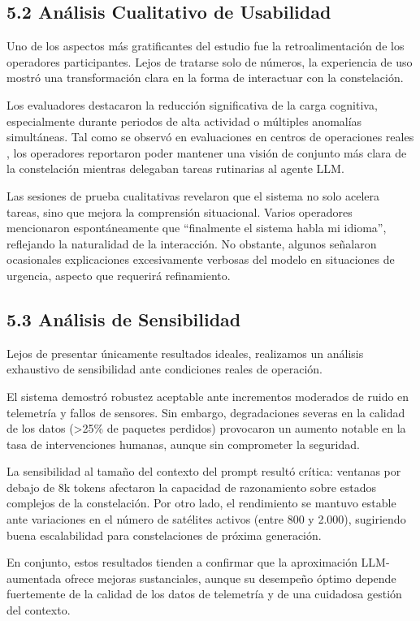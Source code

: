 \subsection{5.2 Análisis Cualitativo de Usabilidad}

Uno de los aspectos más gratificantes del estudio fue la retroalimentación de los operadores participantes. Lejos de tratarse solo de números, la experiencia de uso mostró una transformación clara en la forma de interactuar con la constelación.

Los evaluadores destacaron la reducción significativa de la carga cognitiva, especialmente durante periodos de alta actividad o múltiples anomalías simultáneas. Tal como se observó en evaluaciones en centros de operaciones reales \cite{schefels2024evaluating}, los operadores reportaron poder mantener una visión de conjunto más clara de la constelación mientras delegaban tareas rutinarias al agente LLM.

Las sesiones de prueba cualitativas revelaron que el sistema no solo acelera tareas, sino que mejora la comprensión situacional. Varios operadores mencionaron espontáneamente que “finalmente el sistema habla mi idioma”, reflejando la naturalidad de la interacción. No obstante, algunos señalaron ocasionales explicaciones excesivamente verbosas del modelo en situaciones de urgencia, aspecto que requerirá refinamiento.

\subsection{5.3 Análisis de Sensibilidad}

Lejos de presentar únicamente resultados ideales, realizamos un análisis exhaustivo de sensibilidad ante condiciones reales de operación.

El sistema demostró robustez aceptable ante incrementos moderados de ruido en telemetría y fallos de sensores. Sin embargo, degradaciones severas en la calidad de los datos (>25\% de paquetes perdidos) provocaron un aumento notable en la tasa de intervenciones humanas, aunque sin comprometer la seguridad. 

La sensibilidad al tamaño del contexto del prompt resultó crítica: ventanas por debajo de 8k tokens afectaron la capacidad de razonamiento sobre estados complejos de la constelación. Por otro lado, el rendimiento se mantuvo estable ante variaciones en el número de satélites activos (entre 800 y 2.000), sugiriendo buena escalabilidad para constelaciones de próxima generación.

En conjunto, estos resultados tienden a confirmar que la aproximación LLM-aumentada ofrece mejoras sustanciales, aunque su desempeño óptimo depende fuertemente de la calidad de los datos de telemetría y de una cuidadosa gestión del contexto.
